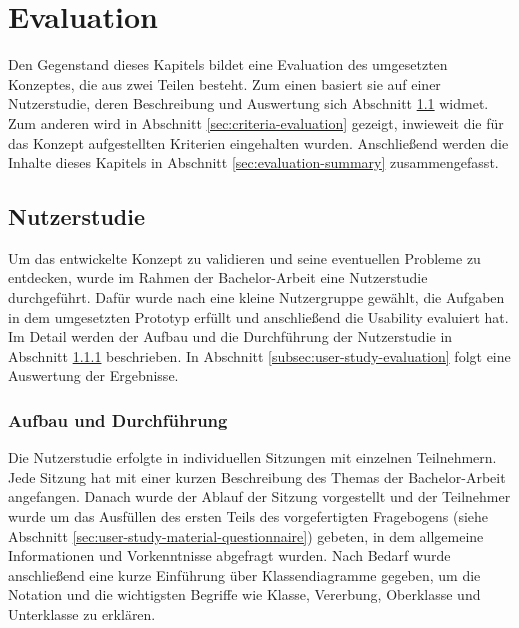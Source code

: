 
\chapter{Evaluation}
\label{chapter:evaluation}

Den Gegenstand dieses Kapitels bildet eine Evaluation des umgesetzten Konzeptes, die aus zwei Teilen besteht. Zum einen basiert sie auf einer Nutzerstudie, deren Beschreibung und Auswertung sich Abschnitt \ref{sec:user-study} widmet. Zum anderen wird in Abschnitt \ref{sec:criteria-evaluation} gezeigt, inwieweit die für das Konzept aufgestellten Kriterien eingehalten wurden. Anschließend werden die Inhalte dieses Kapitels in Abschnitt \ref{sec:evaluation-summary} zusammengefasst.

\section{Nutzerstudie}
\label{sec:user-study}

Um das entwickelte Konzept zu validieren und seine eventuellen Probleme zu entdecken, wurde im Rahmen der Bachelor-Arbeit eine Nutzerstudie durchgeführt. Dafür wurde nach \cite{Nielsen09Discount} eine kleine Nutzergruppe gewählt, die Aufgaben in dem umgesetzten Prototyp erfüllt und anschließend die Usability evaluiert hat. Im Detail werden der Aufbau und die Durchführung der Nutzerstudie in Abschnitt \ref{subsec:user-study-setup} beschrieben. In Abschnitt \ref{subsec:user-study-evaluation} folgt eine Auswertung der Ergebnisse.

\subsection{Aufbau und Durchführung}
\label{subsec:user-study-setup}

Die Nutzerstudie erfolgte in individuellen Sitzungen mit einzelnen Teilnehmern. Jede Sitzung hat mit einer kurzen Beschreibung des Themas der Bachelor-Arbeit angefangen. Danach wurde der Ablauf der Sitzung vorgestellt und der Teilnehmer wurde um das Ausfüllen des ersten Teils des vorgefertigten Fragebogens (siehe Abschnitt \ref{sec:user-study-material-questionnaire}) gebeten, in dem allgemeine Informationen und Vorkenntnisse abgefragt wurden. Nach Bedarf wurde anschließend eine kurze Einführung über Klassendiagramme gegeben, um die Notation und die wichtigsten Begriffe wie Klasse, Vererbung, Oberklasse und Unterklasse zu erklären.

